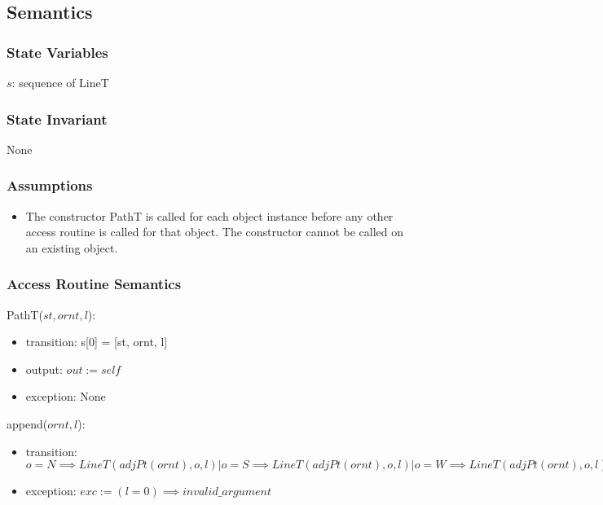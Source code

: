 \documentclass[12pt]{article}
\begin{document}
\subsection* {Semantics}

\subsubsection* {State Variables}

$s$: sequence of LineT

\subsubsection* {State Invariant}

None

\subsubsection* {Assumptions}

\begin{itemize}
\item The constructor PathT is called for each object instance before any other
access routine is called for that object.  The constructor cannot be called on
an existing object.
\end{itemize}

\subsubsection* {Access Routine Semantics}

PathT($st, ornt, l$):
\begin{itemize}
\item transition: s[0] = [st, ornt, l]
\item output: $out := \mathit{self}$
\item exception: None
\end{itemize}

\noindent append($ornt, l$):
\begin{itemize}
\item transition: $o = N \implies LineT(adjPt(ornt), o, l)|o = S \implies LineT(adjPt(ornt), o, l)|o = W \implies LineT(adjPt(ornt), o, l)|o = E \implies LineT(adjPt(ornt), o, l)$
\item exception: $exc := (l = 0) \implies invalid\_argument$
\end{itemize}
\end{document}
